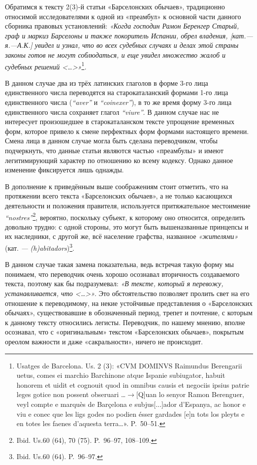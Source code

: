 Обратимся к тексту 2(3)-й статьи «Барселонских обычаев», традиционно относимой исследователями к одной из «преамбул» к основной части данного сборника правовых установлений: \emph{«Когда господин Рамон Беренгер Старый, граф и маркиз Барселоны и также покоритель Испании, обрел владения, [кат.---я.---А.К.] увидел и узнал, }\emph{что во всех судебных случаях и делах этой страны законы готов не могут соблюдаться, и еще увидел множество жалоб и судебных решений <…>»}\footnote{Usatges de Barcelona. Us. 2 (3): «CVM DOMINVS Raimundus Berengarii uetus, comes ei marchio Barchinone atque Ispanie subiugator, habuit honorem et uidit et cognouit quod in omnibus causis et negociis ipsius patrie leges gotice non possent obseruari …$\rightarrow$[Q]uan lo senyor Ramon Berenguer, veyl compte e marquès de Barçelona e subjus[...]ador d’Espanya, ac honor e viu e conec que les ligs godes no podien ésser gardades [e]n tots los pleyts e en totes les faenes d’aquesta terra…». P.~50--51.}\emph{.}

В данном случае два из трёх латинских глаголов в форме 3-го лица единственного числа переводятся на старокаталанский формами 1-го лица единственного числа (\emph{“}\emph{aver}\emph{” }и \emph{“}\emph{coinexer}\emph{”}), в то же время форму 3-го лица единственного числа сохраняет глагол \emph{“}\emph{viure}\emph{”}. В данном случае нас не интересует произошедшее в старокаталанском тексте упрощение временных форм, которое привело к смене перфектных форм формами настоящего времени. Смена лица в данном случае могла быть сделана переводчиком, чтобы подчеркнуть, что данные статьи являются частью «преамбулы» и имеют легитимирующий характер по отношению ко всему кодексу. Однако данное изменение фиксируется лишь однажды.

В дополнение к приведённым выше соображениям стоит отметить, что на протяжении всего текста «Барселонских обычаев», а не только касающихся деятельности и положения правителя, используется притяжательное местоимение \emph{“}\emph{nos}\emph{tres}\emph{”}\footnote{Ibid. Us.60 (64), 70 (75). P.~96--97, 108--109.}, вероятно, поскольку субъект, к которому оно относится, определить довольно трудно: с одной стороны, это могут быть вышеназванные принцепсы и их наследники, с другой же, всё население графства, названное \emph{«жителями»}\emph{ }(кат.\emph{ --- }\emph{(}\emph{h}\emph{)}\emph{abitadors})\footnote{Ibid. Us.60 (64). P.~96--97.}.

В данном случае такая замена показательна, ведь встречая такую форму мы понимаем, что переводчик очень хорошо осознавал вторичность создаваемого текста, поэтому как бы подразумевал: \emph{«В тексте, который я перево}\emph{ж}\emph{у, устанавливается, что <…>»}. Это обстоятельство позволяет пролить свет на его отношение к переводимому, на некие устойчивые представления о «Барселонских обычаях», существовавшие в обозначенный период, трепет и почтение, с которым к данному тексту относились легисты. Переводчик, по нашему мнению, вполне осознавал, что с «оригинальным» текстом «Барселонских обычаев», покрытым ореолом важности и даже «сакральности», ничего не происходит.

